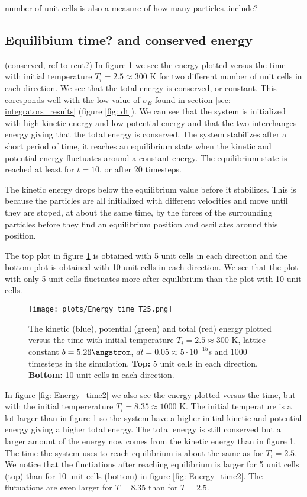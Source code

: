 \documentclass[11pt,a4wide]{article}
\begin{document}
number of unit cells is also a measure of how many particles..include?


\subsection{Equilibium time? and conserved energy}
(conserved, ref to rcut?)
In figure \ref{fig: Energy_time1} we see the energy plotted versus the time with initial temperature $T_i = 2.5 \approx 300$ K for two different number of unit cells in each direction. We see that the total energy is conserved, or constant. This coresponds well with the low value of $\sigma_E$ found in section \ref{sec: integrators_results} (figure \ref{fig: dt}). We can see that the system is initialized with high kinetic energy and low potential energy and that the two interchanges energy giving that the total energy is conserved. The system stabilizes after a short period of time, it reaches an equilibrium state when the kinetic and potential energy fluctuates around a constant energy. The equilibrium state is reached at least for $t=10$, or after 20 timesteps. 

The kinetic energy drops below the equilibrium value before it stabilizes. This is because the particles are all initialized with different velocities and move until they are stoped, at about the same time, by the forces of the surrounding particles before they find an equilibrium position and oscillates around this position.  

The top plot in figure \ref{fig: Energy_time1} is obtained with 5 unit cells in each direction and the bottom plot is obtained with 10 unit cells in each direction. We see that the plot with only 5 unit cells fluctuates more after equilibrium than the plot with 10 unit cells. 

\begin{figure}[htp]
\centering
\texttt{[image: plots/Energy\_time\_T25.png]}
\caption{The kinetic (blue), potential (green) and total (red) energy plotted versus the time with initial temperature $T_i = 2.5 \approx 300$ K, lattice constant $b=5.26 \angstrom$, $dt=0.05\approx  5\cdot 10^{-15}$s and 1000 timesteps in the simulation. \textbf{Top:} 5 unit cells in each direction. \textbf{Bottom:} 10 unit cells in each direction.}
\label{fig: Energy_time1}
\end{figure}

In figure \ref{fig: Energy_time2} we also see the energy plotted versus the time, but with the initial tempererature $T_i = 8.35 \approx 1000$ K. The initial temperature is a lot larger than in figure \ref{fig: Energy_time1} so the system have a higher initial kinetic and potential energy giving a higher total energy. The total energy is still conserved but a larger amount of the energy now comes from the kinetic energy than in figure \ref{fig: Energy_time1}. The time the system uses to reach equilibrium is about the same as for $T_i=2.5$. We notice that the fluctiations after reaching equilibrium is larger for 5 unit cells (top) than for 10 unit cells (bottom) in figure \ref{fig: Energy_time2}. The flutuations are even larger for $T=8.35$ than for $T=2.5$. 
\end{document}
